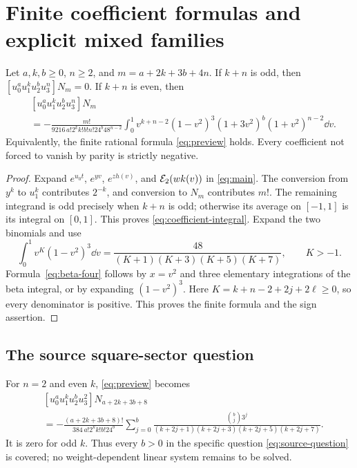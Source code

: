 \section{Finite coefficient formulas and explicit mixed families}
\label{sec:coefficients}

\begin{corollary}\label{cor:coefficients}
Let $a,k,b\ge0$, $n\ge2$, and $m=a+2k+3b+4n$. If $k+n$ is odd,
then $[u_0^au_1^ku_2^bu_3^n]N_m=0$. If $k+n$ is even, then
\begin{equation}\label{eq:coefficient-integral}
\begin{split}
 &[u_0^au_1^ku_2^bu_3^n]N_m\\
 &=-\frac{m!}{9216\,a!2^kk!b!n!24^b48^{n-2}}
 \int_0^1v^{k+n-2}(1-v^2)^3
       (1+3v^2)^b(1+v^2)^{n-2}\dd v.
\end{split}
\end{equation}
Equivalently, the finite rational formula \eqref{eq:preview} holds.
Every coefficient not forced to vanish by parity is strictly negative.
\end{corollary}
\begin{proof}
Expand $e^{u_0t}$, $e^{yv}$, $e^{zh(v)}$, and $\mathcal E_2(wk(v))$ in
\eqref{eq:main}. The conversion from $y^k$ to $u_1^k$ contributes
$2^{-k}$, and conversion to $N_m$ contributes $m!$. The remaining
integrand is odd precisely when $k+n$ is odd; otherwise its average on
$[-1,1]$ is its integral on $[0,1]$. This proves
\eqref{eq:coefficient-integral}. Expand the two binomials and use
\begin{equation}\label{eq:beta-four}
 \int_0^1v^K(1-v^2)^3\dd v
 =\frac{48}{(K+1)(K+3)(K+5)(K+7)},\qquad K>-1.
\end{equation}
Formula~\eqref{eq:beta-four} follows by $x=v^2$ and three elementary
integrations of the beta integral, or by expanding $(1-v^2)^3$.
Here $K=k+n-2+2j+2\ell\ge0$, so every denominator is positive.
This proves the finite formula and the sign assertion.
\end{proof}

\subsection{The source square-sector question}
For $n=2$ and even $k$, \eqref{eq:preview} becomes
\begin{equation}\label{eq:square-answer}
\boxed{\begin{aligned}
 &[u_0^au_1^ku_2^bu_3^2]N_{a+2k+3b+8}\\
 &=-\frac{(a+2k+3b+8)!}{384\,a!2^kk!b!24^b}
 \sum_{j=0}^b
 \frac{\binom bj3^j}
 {(k+2j+1)(k+2j+3)(k+2j+5)(k+2j+7)}.
\end{aligned}}
\end{equation}
It is zero for odd $k$. Thus every $b>0$ in the specific question
\eqref{eq:source-question} is covered; no weight-dependent linear
system remains to be solved.

